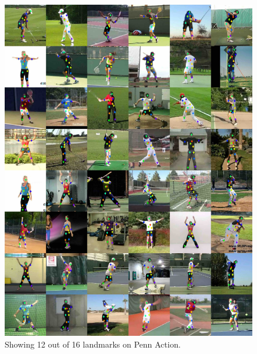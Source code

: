 \begin{figure}[t]
	\centering
	\includegraphics[trim={0cm 0cm 0cm 0cm},clip, width=1.\linewidth]{fig/supp/select48penn}
	\caption{Showing 12 out of 16 landmarks on Penn Action.}
	\label{fig:kp_penn}
\end{figure}


